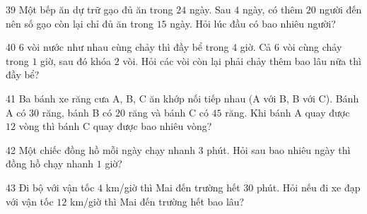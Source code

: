 \gap
\begin{probbox}{39}{}
Một bếp ăn dự trữ gạo đủ ăn trong $24$ ngày. Sau $4$ ngày, có thêm $20$ người đến nên số gạo còn lại chỉ đủ ăn trong $15$ ngày. Hỏi lúc đầu có bao nhiêu người?
\end{probbox}
\gap
\begin{probbox}{40}{}
$6$ vòi nước như nhau cùng chảy thì đầy bể trong $4$ giờ. Cả $6$ vòi cùng chảy trong $1$ giờ, sau đó khóa $2$ vòi. Hỏi các vòi còn lại phải chảy thêm bao lâu nữa thì đầy bể?
\end{probbox}
\gap
\begin{probbox}{41}{}
Ba bánh xe răng cưa A, B, C ăn khớp nối tiếp nhau (A với B, B với C). Bánh A có $30$ răng, bánh B có $20$ răng và bánh C có $45$ răng. Khi bánh A quay được $12$ vòng thì bánh C quay được bao nhiêu vòng?
\end{probbox}
\gap
\begin{probbox}{42}{}
Một chiếc đồng hồ mỗi ngày chạy nhanh $3$ phút. Hỏi sau bao nhiêu ngày thì đồng hồ chạy nhanh $1$ giờ?
\end{probbox}
\gap
\begin{probbox}{43}{}
Đi bộ với vận tốc $4$ km/giờ thì Mai đến trường hết $30$ phút. Hỏi nếu đi xe đạp với vận tốc $12$ km/giờ thì Mai đến trường hết bao lâu?
\end{probbox}
